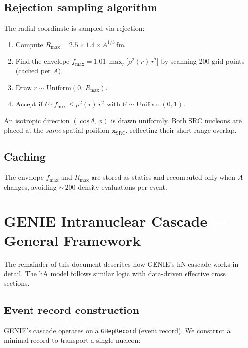 \documentclass[11pt,a4paper]{article}
\newcommand{\vect}[1]{\bm{#1}}
\newcommand{\unit}[1]{\,\mathrm{#1}}
\newcommand{\fm}{\unit{fm}}
\begin{document}
\subsection{Rejection sampling algorithm}

The radial coordinate is sampled via rejection:
\begin{enumerate}
  \item Compute $R_{\max} = 2.5 \times 1.4 \times A^{1/3}\fm$.
  \item Find the envelope $f_{\max} = 1.01\,\max_{r}\bigl[\rho^{2}(r)\,r^{2}\bigr]$
        by scanning 200 grid points (cached per $A$).
  \item Draw $r \sim \text{Uniform}(0,\,R_{\max})$.
  \item Accept if $U \cdot f_{\max} \le \rho^{2}(r)\,r^{2}$
        with $U \sim \text{Uniform}(0,1)$.
\end{enumerate}

An isotropic direction $(\cos\theta,\,\phi)$ is drawn uniformly.
Both SRC nucleons are placed at the \emph{same} spatial position
$\vect{x}_{\text{SRC}}$, reflecting their short-range overlap.

\subsection{Caching}

The envelope $f_{\max}$ and $R_{\max}$ are stored as statics and
recomputed only when $A$ changes, avoiding ${\sim}\,200$ density
evaluations per event.

\section{GENIE Intranuclear Cascade --- General Framework}
\label{sec:cascade}

The remainder of this document describes how GENIE's hN cascade works in
detail.  The hA model follows similar logic with data-driven effective
cross sections.

\subsection{Event record construction}
\label{sec:evrec}

GENIE's cascade operates on a \texttt{GHepRecord} (event record).  We
construct a minimal record to transport a single nucleon:
\end{document}
